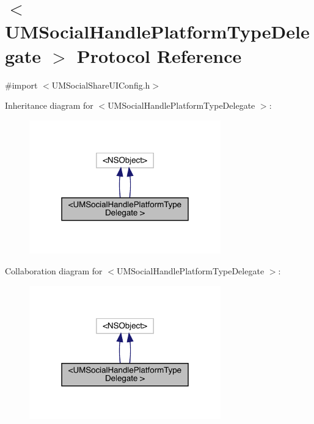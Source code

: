 \hypertarget{protocol_u_m_social_handle_platform_type_delegate_01-p}{}\section{$<$U\+M\+Social\+Handle\+Platform\+Type\+Delegate $>$ Protocol Reference}
\label{protocol_u_m_social_handle_platform_type_delegate_01-p}


{\ttfamily \#import $<$U\+M\+Social\+Share\+U\+I\+Config.\+h$>$}



Inheritance diagram for $<$U\+M\+Social\+Handle\+Platform\+Type\+Delegate $>$\+:\nopagebreak
\begin{figure}[H]
\begin{center}
\leavevmode
\includegraphics[width=235pt]{protocol_u_m_social_handle_platform_type_delegate_01-p__inherit__graph}
\end{center}
\end{figure}


Collaboration diagram for $<$U\+M\+Social\+Handle\+Platform\+Type\+Delegate $>$\+:\nopagebreak
\begin{figure}[H]
\begin{center}
\leavevmode
\includegraphics[width=235pt]{protocol_u_m_social_handle_platform_type_delegate_01-p__coll__graph}
\end{center}
\end{figure}
